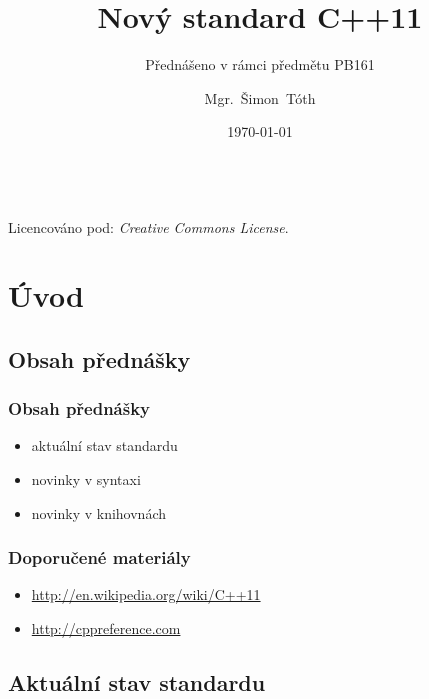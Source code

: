 

\title{Nový standard C++11}
\subtitle{Přednášeno v rámci předmětu PB161}
\author[]{Mgr.~Šimon~Tóth}
\date{\today}

\newcommand{\CcNote}[1]{%
        Licencováno pod: \textit{Creative Commons #1 3.0 License}.%
}



\begin{frame}
\titlepage
	\vfill
	\begin{center}
		\\ {\tiny\CcNote{\CcLongnameByNcSa}}
		\vspace*{2ex}
	\end{center}
\end{frame}

\section{Úvod}
\subsection{Obsah přednášky}

\begin{frame} \frametitle{Obsah přednášky}
	\begin{itemize}
		\item{aktuální stav standardu} \pause
		\item{novinky v syntaxi} \pause
		\item{novinky v knihovnách}
	\end{itemize}
\end{frame}

\begin{frame} \frametitle{Doporučené materiály}
	\begin{itemize}
		\item{\url{http://en.wikipedia.org/wiki/C++11}}
		\item{\url{http://cppreference.com}}
	\end{itemize}
\end{frame}

\subsection{Aktuální stav standardu}

